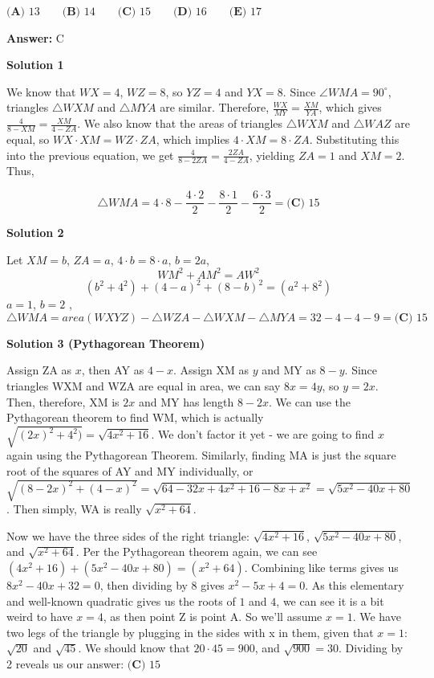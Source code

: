 \begin{enumerate}
$\textbf{(A) }13 \qquad \textbf{(B) }14 \qquad \textbf{(C) }15 \qquad \textbf{(D) }16 \qquad \textbf{(E) }17 \qquad$

 \textbf{Answer: }C



\textbf{Solution 1}

We know that $WX = 4$, $WZ = 8$, so $YZ = 4$ and $YX = 8$. Since $\angle WMA = 90^\circ$, triangles $\triangle WXM$ and $\triangle MYA$ are similar. Therefore, $\frac{WX}{MY} = \frac{XM}{YA}$, which gives $\frac{4}{8 - XM} = \frac{XM}{4 - ZA}$. We also know that the areas of triangles $\triangle WXM$ and $\triangle WAZ$ are equal, so $WX \cdot XM = WZ \cdot ZA$, which implies $4 \cdot XM = 8 \cdot ZA$. Substituting this into the previous equation, we get $\frac{4}{8 - 2ZA} = \frac{2ZA}{4 - ZA}$, yielding $ZA = 1$ and $XM = 2$. Thus,

 
 \[\triangle WMA = 4 \cdot 8 - \frac{4 \cdot 2}{2} - \frac{8 \cdot 1}{2} - \frac{6 \cdot 3}{2} = \boxed{\textbf{(C) }15}\]




\textbf{Solution 2}

Let $XM=b$, $ZA = a$, $4\cdot b= 8\cdot a$, $b = 2a$, 
 \[WM^2 + AM^2 = AW^2\]
 \[(b^2+4^2) + (4-a)^2 + (8-b)^2  = (a^2 + 8^2)\]$a=1$, $b=2$ , 
 \[\triangle WMA = area(WXYZ) - \triangle WZA- \triangle WXM- \triangle MYA = 32 - 4-4-9 = \boxed{\textbf{(C) }15}\]




\textbf{Solution 3 (Pythagorean Theorem)}

Assign ZA as $x$, then AY as $4 - x$. Assign XM as $y$ and MY as $8 - y$. Since triangles WXM and WZA are equal in area, we can say $8x = 4y$, so $y = 2x$. Then, therefore, XM is $2x$ and MY has length $8 - 2x$. We can use the Pythagorean theorem to find WM, which is actually $\sqrt{(2x)^2 + 4^2)} = \sqrt{4x^2 + 16}$. We don't factor it yet - we are going to find $x$ again using the Pythagorean Theorem. Similarly, finding MA is just the square root of the squares of AY and MY individually, or $\sqrt{(8 - 2x)^2 + (4 - x)^2} = \sqrt{64 - 32x + 4x^2 + 16 - 8x + x^2} = \sqrt{5x^2 - 40x + 80}$. Then simply, WA is really $\sqrt{x^2 + 64}$.

 Now we have the three sides of the right triangle: $\sqrt{4x^2 + 16}$, $\sqrt{5x^2 - 40x + 80}$, and $\sqrt{x^2 + 64}$. Per the Pythagorean theorem again, we can see $(4x^2 + 16) + (5x^2 - 40x + 80) = (x^2 + 64)$. Combining like terms gives us $8x^2 - 40x + 32 = 0$, then dividing by 8 gives $x^2 - 5x + 4 = 0$. As this elementary and well-known quadratic gives us the roots of $1$ and $4$, we can see it is a bit weird to have $x = 4$, as then point Z is point A. So we'll assume $x = 1$. We have two legs of the triangle by plugging in the sides with x in them, given that $x = 1$: $\sqrt{20}$ and $\sqrt{45}$. We should know that $20 \cdot 45 = 900$, and $\sqrt{900} = 30.$ Dividing by 2 reveals us our answer: $\boxed{\textbf{(C) }15}$


\end{enumerate}
